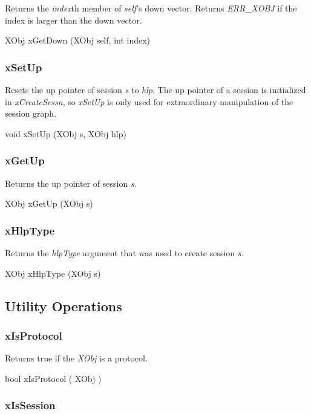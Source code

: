 Returns the {\em index}th member of {\em self}'s down vector.  Returns
{\em ERR\_XOBJ} if the index is larger than the down vector.
\medskip

{\sem XObj} {\bold xGetDown} ({\sem XObj} {\caps self}, {\sem int} {\caps index})


\subsubsection{xSetUp}

Resets the up pointer of session {\em s} to {\em hlp}.  The up pointer
of a session is initialized in {\em xCreateSessn}, so {\em xSetUp}
is only used for extraordinary manipulation of the session graph.
\medskip

{\sem void} {\bold xSetUp} ({\sem XObj} {\caps s}, {\sem XObj} {\caps hlp})


\subsubsection{xGetUp}

Returns the up pointer of session {\em s}.
\medskip

{\sem XObj} {\bold xGetUp} ({\sem XObj} {\caps s})


\subsubsection{xHlpType}

Returns the {\em hlpType} argument that was used to create session
{\em s.}
\medskip

{\sem XObj} {\bold xHlpType} ({\sem XObj} {\caps s})



\subsection{ Utility Operations }

\subsubsection{xIsProtocol}

Returns true if the {\em XObj} is a protocol.
\medskip

{\sem bool} {\bold xIsProtocol} ( {\sem XObj} )



\subsubsection{xIsSession}

